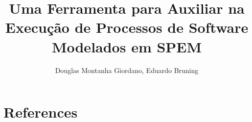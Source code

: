 \documentclass[12pt]{article}
\title{Uma Ferramenta para Auxiliar na Execução de Processos de Software Modelados em SPEM}
\author{Douglas Montanha Giordano\inst{1},  Eduardo Bruning\inst{2}}
\begin{document}
 

\maketitle











\section{References}


\end{document}
